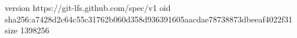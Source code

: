 version https://git-lfs.github.com/spec/v1
oid sha256:a7428d2c64c55c31762b060d358d936391605aacdae78738873dbeeaf4022f31
size 1398256
